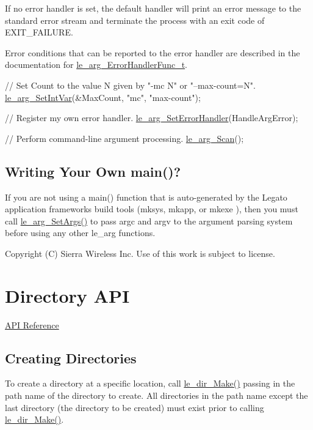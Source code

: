 If no error handler is set, the default handler will print an error message to the standard error stream and terminate the process with an exit code of E\+X\+I\+T\+\_\+\+F\+A\+I\+L\+U\+R\+E.

Error conditions that can be reported to the error handler are described in the documentation for \hyperlink{le__args_8h_a52331d81cc8f4a20089598b0ab362786}{le\+\_\+arg\+\_\+\+Error\+Handler\+Func\+\_\+t}.


\begin{DoxyCode}
\textcolor{comment}{// Set Count to the value N given by "-mc N" or "--max-count=N".}
\hyperlink{le__args_8h_a27f1486b1e855559158e218a7d93ce73}{le\_arg\_SetIntVar}(&MaxCount, \textcolor{stringliteral}{"mc"}, \textcolor{stringliteral}{"max-count"});

\textcolor{comment}{// Register my own error handler.}
\hyperlink{le__args_8h_a5128be1cbe2c7b30f1f697f8b5594479}{le\_arg\_SetErrorHandler}(HandleArgError);

\textcolor{comment}{// Perform command-line argument processing.}
\hyperlink{le__args_8h_af44485fc914a7ac6f562d23d66c3410c}{le\_arg\_Scan}();
\end{DoxyCode}
\hypertarget{c_args_c_args_writingYourOwnMain}{}\subsection{Writing Your Own main()?}\label{c_args_c_args_writingYourOwnMain}
If you are not using a main() function that is auto-\/generated by the Legato application framework\textquotesingle{}s build tools ({\ttfamily mksys}, {\ttfamily mkapp}, or {\ttfamily mkexe} ), then you must call \hyperlink{le__args_8h_aefd062c124811c5de122a06907e19b56}{le\+\_\+arg\+\_\+\+Set\+Args()} to pass {\ttfamily argc} and {\ttfamily argv} to the argument parsing system before using any other {\ttfamily le\+\_\+arg} functions.





Copyright (C) Sierra Wireless Inc. Use of this work is subject to license. \hypertarget{c_dir}{}\section{Directory A\+P\+I}\label{c_dir}
\hyperlink{le__dir_8h}{A\+P\+I Reference}\hypertarget{c_dir_c_dir_create}{}\subsection{Creating Directories}\label{c_dir_c_dir_create}
To create a directory at a specific location, call {\ttfamily \hyperlink{le__dir_8h_a7ac7d25b67f2e47127084677626d5344}{le\+\_\+dir\+\_\+\+Make()}} passing in the path name of the directory to create. All directories in the path name except the last directory (the directory to be created) must exist prior to calling \hyperlink{le__dir_8h_a7ac7d25b67f2e47127084677626d5344}{le\+\_\+dir\+\_\+\+Make()}.

